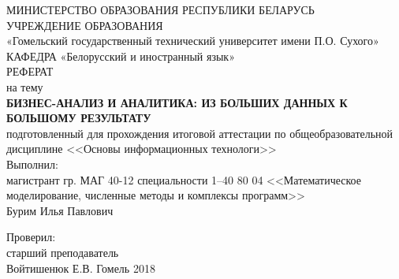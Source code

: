 \begin{titlepage}
	\large
	\begin{center}
		\vspace{3mm}
		МИНИСТЕРСТВО ОБРАЗОВАНИЯ РЕСПУБЛИКИ БЕЛАРУСЬ\\
		УЧРЕЖДЕНИЕ ОБРАЗОВАНИЯ\\
		«Гомельский государственный технический университет имени П.О. Сухого»\\
		\vspace{10mm}
		КАФЕДРА «Белорусский и иностранный язык»\\
		\vspace{30mm}
		РЕФЕРАТ\\
		на тему\\
			\textbf{\MakeTextUppercase{ Бизнес-анализ и аналитика: из больших данных к большому результату
		}}\\
	\vspace{5mm}
		подготовленный для прохождения итоговой аттестации 
		по общеобразовательной дисциплине 
		<<Основы информационных технологи>>\\
	\vspace{40mm}
		Выполнил:\\
		магистрант гр. МАГ 40-12
		специальности 1–40 80 04 <<Математическое моделирование, численные методы и комплексы программ>>\\
		Бурим Илья Павлович
		
	\vspace{15mm}
		Проверил:\\
		старший преподаватель\\
		Войтишенюк Е.В.
	\vfill
		Гомель 2018
	\end{center}
\end{titlepage}
